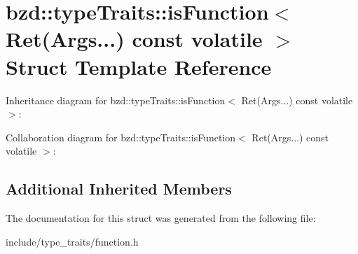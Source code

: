 \hypertarget{structbzd_1_1typeTraits_1_1isFunction_3_01Ret_07Args_8_8_8_08_01const_01volatile_01_4}{}\section{bzd\+:\+:type\+Traits\+:\+:is\+Function$<$ Ret(Args...) const volatile $>$ Struct Template Reference}
\label{structbzd_1_1typeTraits_1_1isFunction_3_01Ret_07Args_8_8_8_08_01const_01volatile_01_4}


Inheritance diagram for bzd\+:\+:type\+Traits\+:\+:is\+Function$<$ Ret(Args...) const volatile $>$\+:


Collaboration diagram for bzd\+:\+:type\+Traits\+:\+:is\+Function$<$ Ret(Args...) const volatile $>$\+:
\subsection*{Additional Inherited Members}


The documentation for this struct was generated from the following file\+:\begin{DoxyCompactItemize}
\item 
include/type\+\_\+traits/function.\+h\end{DoxyCompactItemize}
